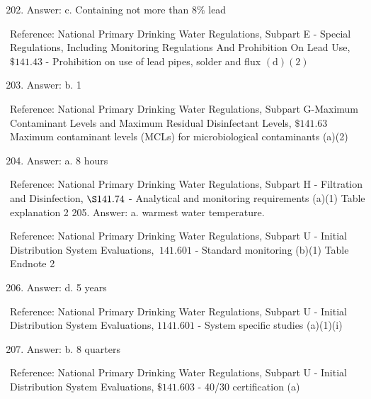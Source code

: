 \documentclass[10pt]{article}
\begin{document}
\begin{enumerate}
  \setcounter{enumi}{201}
  \item Answer: c. Containing not more than $8 \%$ lead
\end{enumerate}

Reference: National Primary Drinking Water Regulations, Subpart E - Special Regulations, Including Monitoring Regulations And Prohibition On Lead Use, $\$ 141.43$ - Prohibition on use of lead pipes, solder and flux $(\mathrm{d})(2)$

\begin{enumerate}
  \setcounter{enumi}{202}
  \item Answer: b. 1
\end{enumerate}

Reference: National Primary Drinking Water Regulations, Subpart G-Maximum Contaminant Levels and Maximum Residual Disinfectant Levels, $\$ 141.63$ Maximum contaminant levels (MCLs) for microbiological contaminants (a)(2)

\begin{enumerate}
  \setcounter{enumi}{203}
  \item Answer: a. 8 hours
\end{enumerate}

Reference: National Primary Drinking Water Regulations, Subpart $\mathrm{H}$ - Filtration and Disinfection, $\S 141.74$ - Analytical and monitoring requirements (a)(1) Table explanation 2 205. Answer: a. warmest water temperature.

Reference: National Primary Drinking Water Regulations, Subpart U - Initial Distribution System Evaluations, $\ 141.601$ - Standard monitoring (b)(1) Table Endnote 2

\begin{enumerate}
  \setcounter{enumi}{205}
  \item Answer: d. 5 years
\end{enumerate}

Reference: National Primary Drinking Water Regulations, Subpart U - Initial Distribution System Evaluations, $1141.601$ - System specific studies (a)(1)(i)

\begin{enumerate}
  \setcounter{enumi}{206}
  \item Answer: b. 8 quarters
\end{enumerate}

Reference: National Primary Drinking Water Regulations, Subpart U - Initial Distribution System Evaluations, $\$ 141.603$ - 40/30 certification (a)
\end{document}
